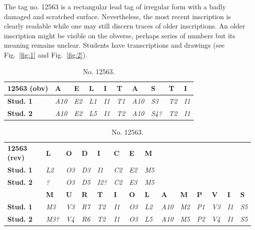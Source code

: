 \documentclass[amsthm,ebook]{saparticle}
\begin{document}
\vspace{0,5cm}

The tag no. 12563 is a rectangular lead tag of irregular form with a badly damaged and scratched surface. Nevertheless, the most
recent inscription is clearly readable while one may still discern traces of older inscriptions. An older inscription
might be visible on the obverse, perhaps series of numbers but its meaning remains unclear. Students have
transcriptions and drawings (see Fig.~\ref{fig:1} and Fig.~\ref{fig:2}).


\begin{table}[!hbp]
{\small
\addtolength{\tabcolsep}{-0.7mm}
\begin{tabular*}{\textwidth}{llllllllll}
\toprule
\textbf{12563 (obv)} & \textbf{A} & \textbf{E} & \textbf{L} & \textbf{I} & \textbf{T} & \textbf{A} & \textbf{S} & \textbf{T} & \textbf{I}\\
\midrule
\textbf{Stud. 1} & \textit{A10} & \textit{E2} & \textit{L1} & \textit{I1} & \textit{T1} & \textit{A10} & \textit{S3} & \textit{T2} & \textit{I1} \\
\textbf{Stud. 2} & \textit{A10} & \textit{E2} & \textit{L5} & \textit{I1} & \textit{T2} & \textit{A10} & \textit{S4?} & \textit{T2} & \textit{I1}  \\
\bottomrule
\end{tabular*}

\begin{tabular*}{\textwidth}{llllllllllllll}
 & & & & & & & & & & & & & \\
\toprule
\textbf{12563 (rev)} & \textbf{L} & \textbf{O} & \textbf{D} & \textbf{I} & \textbf{C} & \textbf{E} & \textbf{M} & & & & & &\\
\midrule
\textbf{Stud. 1} & \textit{L2} & \textit{O3} & \textit{D3} & \textit{I1} & \textit{C2} & \textit{E2} & \textit{M5} &  &  & & & & \\
\textbf{Stud. 2} & \textit{?} & \textit{O3} & \textit{D5} & \textit{I2?} & \textit{C2} & \textit{E3} & \textit{M5} & & & & & &  \\
\midrule
 & \textbf{M} & \textbf{U} & \textbf{R} & \textbf{T} & \textbf{I} & \textbf{O} & \textbf{L} & \textbf{A} & \textbf{M} & \textbf{P} & \textbf{V} & \textbf{I} & \textbf{S}\\
 \midrule
\textbf{Stud. 1}& \textit{M3} & \textit{V3} & \textit{R7} & \textit{T2} & \textit{I1} & \textit{O3} & \textit{L2} & \textit{A10} & \textit{M2} & \textit{P1} & \textit{V3} & \textit{I1} & \textit{S5} \\
\textbf{Stud. 2} & \textit{M3?} & \textit{V4} & \textit{R6} & \textit{T2} & \textit{I1} & \textit{O3} & \textit{L5} & \textit{A10} & \textit{M5} & \textit{P2} & \textit{V4} & \textit{I1} & \textit{S5} \\
\bottomrule
\end{tabular*}}

\caption{No. 12563.}
\label{tab:table1}
\end{table}
\end{document}
